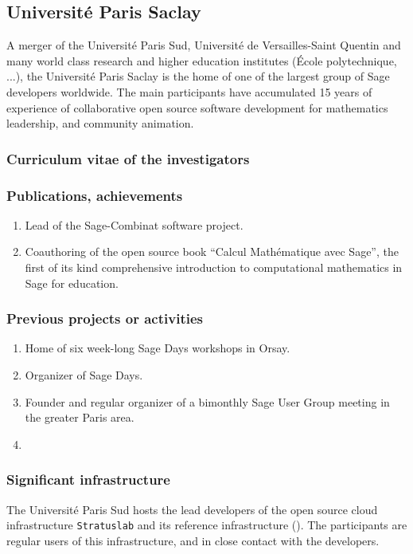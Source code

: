 \subsection*{Université Paris Saclay}

A merger of the Université Paris Sud, Université de Versailles-Saint
Quentin and many world class research and higher education institutes
(École polytechnique, ...), the Université Paris Saclay is the home of
one of the largest group of Sage developers worldwide. The main
participants have accumulated 15 years of experience of collaborative
open source software development for mathematics leadership, and
community animation.

\subsubsection*{Curriculum vitae of the investigators}



\subsubsection*{Publications, achievements}

\begin{enumerate}
\item Lead of the Sage-Combinat software project.
\item Coauthoring of the open source book ``Calcul Mathématique avec
  Sage'', the first of its kind comprehensive introduction to
  computational mathematics in Sage for education.
\end{enumerate}


\subsubsection*{Previous projects or activities}

\begin{enumerate}
\item Home of six week-long Sage Days workshops in Orsay.
\item Organizer of  Sage Days.
\item Founder and regular organizer of a bimonthly Sage User Group
  meeting in the greater Paris area.
\item {}
\end{enumerate}

\subsubsection*{Significant infrastructure}

The Université Paris Sud hosts the lead developers of the open source
cloud infrastructure \texttt{Stratuslab} and its reference
infrastructure (). The participants are regular users
of this infrastructure, and in close contact with the developers.
